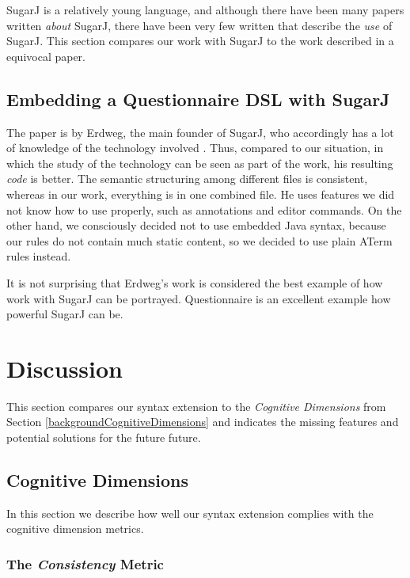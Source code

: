 \documentclass{report}
\begin{document}
SugarJ is a relatively young language, and although there have been many papers written \emph{about} SugarJ, there have been very few written that describe the \emph{use} of SugarJ. This section compares our work with SugarJ to the work described in a equivocal paper.

\subsection{Embedding a Questionnaire DSL with SugarJ}

The paper is by Erdweg, the main founder of SugarJ, who accordingly has a lot of knowledge of the technology involved \cite{Erdweg-Questionnaire-2013}. Thus, compared to our situation, in which the study of the technology can be seen as part of the work, his resulting \emph{code} is better. The semantic structuring among different files is consistent, whereas in our work, everything is in one combined file. He uses features we did not know how to use properly, such as annotations and editor commands. On the other hand, we consciously decided not to use embedded Java syntax, because our rules do not contain much static content, so we decided to use plain ATerm rules instead.

It is not surprising that Erdweg's work is considered the best example of how work with SugarJ can be portrayed. Questionnaire is an excellent example how powerful SugarJ can be.


\section{Discussion}

This section compares our syntax extension to the \emph{Cognitive Dimensions} from Section \ref{backgroundCognitiveDimensions} and indicates the missing features and potential solutions for the future future.

\subsection{Cognitive Dimensions}

In this section we describe how well our syntax extension complies with the cognitive dimension metrics.

\subsubsection*{The \emph{Consistency} Metric}
\end{document}
